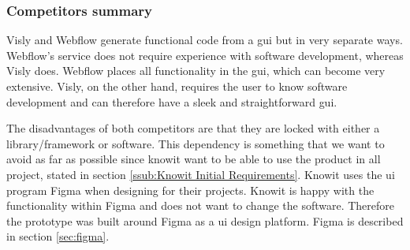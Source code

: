 


\subsubsection{Competitors summary}%
\label{ssub:Comparison}
Visly and Webflow generate functional code from a \acrfull{gui} but in very separate ways. Webflow's service does not require experience with software development, whereas Visly does. Webflow places all functionality in the \acrshort{gui}, which can become very extensive. Visly, on the other hand, requires the user to know software development and can therefore have a sleek and straightforward \acrshort{gui}.

The disadvantages of both competitors are that they are locked with either a library/framework or software. This dependency is something that we want to avoid as far as possible since knowit want to be able to use the product in all project, stated in section \ref{ssub:Knowit Initial Requirements}. Knowit uses the \acrshort{ui} program Figma when designing  for their projects. Knowit is happy with the functionality within Figma and does not want to change the software. Therefore the prototype was built around Figma as a \acrshort{ui} design platform. Figma is described in section \ref{sec:figma}.



